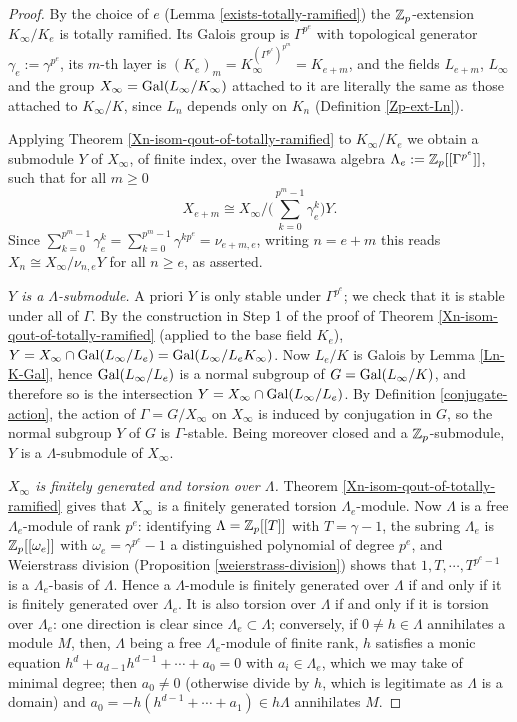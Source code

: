 \begin{proof}
By the choice of $e$ (Lemma \ref{exists-totally-ramified}) the ${\mathbb {Z}}_p$-extension
$K_\infty/K_e$ is totally ramified.
Its Galois group is $\Gamma^{p^e}$ with topological generator
$\gamma_e:=\gamma^{p^e}$, its $m$-th layer is
$(K_e)_m=K_\infty^{(\Gamma^{p^e})^{p^m}}=K_{e+m}$, and the fields $L_{e+m}$,
$L_\infty$ and the group $X_\infty={\mathrm{Gal}}(L_\infty/K_\infty)$ attached to it are
literally the same as those attached to $K_\infty/K$, since $L_n$ depends only on
$K_n$ (Definition \ref{Zp-ext-Ln}).

Applying Theorem \ref{Xn-isom-qout-of-totally-ramified} to $K_\infty/K_e$ we
obtain a submodule $Y$ of $X_\infty$, of finite index, over the Iwasawa algebra
$\Lambda_e:={\mathbb {Z}}_p[[\Gamma^{p^e}]]$, such that for all $m\geq 0$
$$X_{e+m}\cong X_\infty\Big/\Big(\sum_{k=0}^{p^m-1}\gamma_e^k\Big)Y .$$
Since $\sum_{k=0}^{p^m-1}\gamma_e^k=\sum_{k=0}^{p^m-1}\gamma^{kp^e}
=\nu_{e+m,e}$, writing $n=e+m$ this reads $X_n\cong X_\infty/\nu_{n,e}Y$ for all
$n\geq e$, as asserted.

\emph{$Y$ is a $\Lambda$-submodule.}
A priori $Y$ is only stable under $\Gamma^{p^e}$; we check that it is stable
under all of $\Gamma$.
By the construction in Step 1 of the proof of
Theorem \ref{Xn-isom-qout-of-totally-ramified} (applied to the base field
$K_e$), $Y=X_\infty\cap{\mathrm{Gal}}(L_\infty/L_e)={\mathrm{Gal}}(L_\infty/L_eK_\infty)$.
Now $L_e/K$ is Galois by Lemma \ref{Ln-K-Gal}, hence ${\mathrm{Gal}}(L_\infty/L_e)$ is a
normal subgroup of $G={\mathrm{Gal}}(L_\infty/K)$, and therefore so is the intersection
$Y=X_\infty\cap{\mathrm{Gal}}(L_\infty/L_e)$.
By Definition \ref{conjugate-action}, the action of $\Gamma=G/X_\infty$ on
$X_\infty$ is induced by conjugation in $G$, so the normal subgroup $Y$ of $G$ is
$\Gamma$-stable. Being moreover closed and a ${\mathbb {Z}}_p$-submodule, $Y$ is a
$\Lambda$-submodule of $X_\infty$.

\emph{$X_\infty$ is finitely generated and torsion over $\Lambda$.}
Theorem \ref{Xn-isom-qout-of-totally-ramified} gives that $X_\infty$ is a
finitely generated torsion $\Lambda_e$-module.
Now $\Lambda$ is a free $\Lambda_e$-module of rank $p^e$: identifying
$\Lambda={\mathbb {Z}}_p[[T]]$ with $T=\gamma-1$, the subring $\Lambda_e$ is
${\mathbb {Z}}_p[[\omega_e]]$ with $\omega_e=\gamma^{p^e}-1$ a distinguished polynomial of
degree $p^e$, and Weierstrass division
(Proposition \ref{weierstrass-division}) shows that $1,T,\cdots,T^{p^e-1}$ is a
$\Lambda_e$-basis of $\Lambda$.
Hence a $\Lambda$-module is finitely generated over $\Lambda$ if and only if it
is finitely generated over $\Lambda_e$.
It is also torsion over $\Lambda$ if and only if it is torsion over $\Lambda_e$:
one direction is clear since $\Lambda_e\subset\Lambda$; conversely, if
$0\neq h\in\Lambda$ annihilates a module $M$, then, $\Lambda$ being a free
$\Lambda_e$-module of finite rank, $h$ satisfies a monic equation
$h^d+a_{d-1}h^{d-1}+\cdots+a_0=0$ with $a_i\in\Lambda_e$, which we may take of
minimal degree; then $a_0\neq 0$ (otherwise divide by $h$, which is legitimate as
$\Lambda$ is a domain) and $a_0=-h(h^{d-1}+\cdots+a_1)\in h\Lambda$ annihilates
$M$.
\end{proof}

